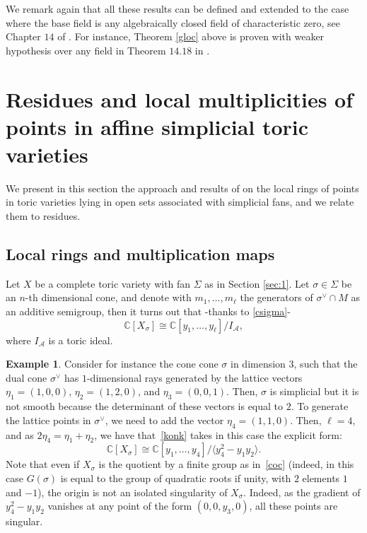 \documentclass[a4paper,11pt]{amsart}
\newcommand{\C}{\mathbb{C}}
\newcommand{\cA}{{\mathcal A}}
\newcounter{thm}
\numberwithin{thm}{section}
\numberwithin{equation}{section}
\theoremstyle{definition}
\newtheorem{example}[thm]{Example}
\theoremstyle{plain}
\begin{document}
We remark again that all these results can be defined and extended to the case where the base field is any algebraically closed field of characteristic zero, see Chapter $14$ of \cite{kun08}. For instance, Theorem \ref{gloc} above is proven with weaker hypothesis over any field in Theorem $14.18$ in \cite{kun08}.


\bigskip
\section{Residues and local multiplicities of points in affine simplicial toric varieties}\label{sec:4}
We present in this section the approach and results of \cite[Section 3.1]{BT22} on the local rings of points in toric varieties lying in open sets associated with simplicial fans, and we relate them to residues. 

\subsection{Local rings and multiplication maps} \label{ssec:localring}

Let $X$ be a complete toric variety with fan $\Sigma$ as in Section \ref{sec:1}. 
Let $\sigma\in\Sigma$ be an $n$-th dimensional cone, and denote with $m_1,\ldots, m_\ell$ the generators of $\sigma^\vee\cap M$ as an additive semigroup, then it turns out that -thanks to \eqref{csigma}-
\begin{equation}\label{konk}
\C[X_\sigma]\cong\C[y_1,\ldots, y_\ell]/ I_{\cA},
\end{equation} where $I_\cA$ is a toric ideal.

\begin{example}
Consider for instance the cone cone $\sigma$ in dimension $3$, such that the dual cone $\sigma^\vee$ has $1$-dimensional rays generated by the lattice vectors $\eta_1=(1,0,0)$, $\eta_2=(1,2,0)$, and $\eta_3=(0,0,1)$. Then, $\sigma$ is simplicial but it is not smooth because
the determinant of these vectors is equal to $2$. To generate the lattice points in
$\sigma^\vee$, we need to add the vector
$\eta_4=(1,1,0)$. Then, $\ell =4$, and as
$2 \eta_4 = \eta_1 + \eta_2$, we have that~\eqref{konk} takes in this case the explicit form:
\begin{equation}\label{eq:presentation}
\C[X_\sigma]\cong\C[y_1,\ldots, y_4]/ \langle y_4^2- y_1 y_2 \rangle.
\end{equation}
Note that even if $X_\sigma$ is the quotient by a finite group as in~\eqref{coc} (indeed, in this case $G(\sigma)$ is equal to the group of quadratic roots if unity, with $2$ elements $1$ and $-1$), the origin is not
an isolated singularity of $X_\sigma$. Indeed, as the gradient of $y_4^2- y_1 y_2$ vanishes
at any point of the form $(0,0, y_3, 0)$, all these points are singular.
\end{example}
\end{document}
